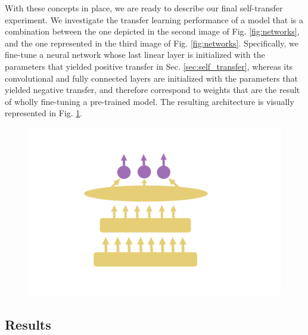 With these concepts in place, we are ready to describe our final self-transfer experiment. We investigate the transfer learning performance of a model that is a combination between the one depicted in the second image of Fig. \ref{fig:networks}, and the one represented in the third image of Fig. \ref{fig:networks}. Specifically, we fine-tune a neural network whose last linear layer is initialized with the parameters that yielded positive transfer in Sec. \ref{sec:self_transfer}, whereas its convolutional and fully connected layers are initialized with the parameters that yielded negative transfer, and therefore correspond to weights that are the result of wholly fine-tuning a pre-trained model. The resulting architecture is visually represented in Fig. \ref{fig:hybrid_network}.

\begin{figure}[ht!]
\centering
\includegraphics[width=\textwidth]{./Images/Chapter08/hybrid_network.pdf}
\caption{}
\label{fig:hybrid_network}
\end{figure}


\subsection{Results}




